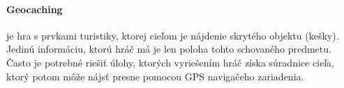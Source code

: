 \paragraph{Geocaching}\cite{geocaching} je hra s prvkami turistiky, ktorej cieľom je nájdenie skrytého objektu (kešky). Jedinú informáciu, ktorú hráč má je len poloha tohto schovaného predmetu. Často je potrebné riešiť úlohy, ktorých vyriešením hráč získa súradnice cieľa, ktorý potom môže nájsť presne pomocou GPS navigačeho zariadenia.